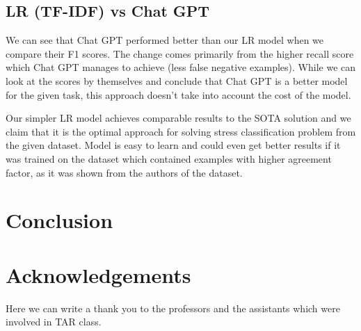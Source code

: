 \documentclass[10pt, a4paper]{article}
\begin{document}
\subsection{LR (TF-IDF) vs Chat GPT}
We can see that Chat GPT performed better than our LR model when we compare their F1 scores.
The change comes primarily from the higher recall score which Chat GPT manages to achieve (less false negative examples).
While we can look at the scores by themselves and conclude that Chat GPT is a better model for the given task, this approach doesn't take into account the cost of the model.

Our simpler LR model achieves comparable results to the SOTA solution and we claim that it is the optimal approach for solving stress classification problem from the given dataset.
Model is easy to learn and could even get better results if it was trained on the dataset which contained examples with higher agreement factor, as it was shown from the authors of the dataset.
\section{Conclusion}



\section*{Acknowledgements}

Here we can write a thank you to the professors and the assistants which were involved in TAR class.



\end{document}
